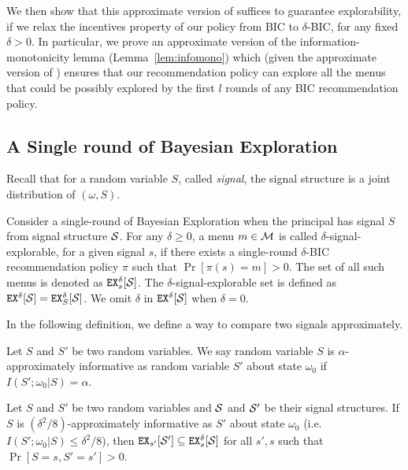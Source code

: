 We then show that this approximate version of   suffices to guarantee explorability, if we relax the incentives property of our policy from BIC to $\delta$-BIC, for any fixed $\delta>0$. In particular, we prove an approximate version of the information-monotonicity lemma (Lemma~\ref{lem:infomono}) which (given the approximate version of ) ensures that our recommendation policy can explore all the menus that could be possibly explored by the first $l$ rounds of any BIC recommendation policy.


\subsection{A Single round of Bayesian Exploration}
\label{sec:private_single}

Recall that for a random variable $S$, called \emph{signal}, the signal structure is a joint distribution of $(\omega,S)$.

\begin{definition}
Consider a single-round of Bayesian Exploration when the principal has signal $S$ from signal structure $\S$. For any $\delta \geq 0$, a menu $m \in \M$ is called $\delta$-signal-explorable, for a given signal $s$, if there exists a single-round $\delta$-BIC recommendation policy $\pi$ such that $\Pr[\pi(s) = m] > 0$. The set of all such menus is denoted as $\EX^{\delta}_s[\S]$. The $\delta$-signal-explorable set is defined as $\EX^{\delta}[\S] = \EX^{\delta}_S[\S]$. We omit $\delta$ in $\EX^{\delta}[\S]$ when $\delta = 0$.
\end{definition}

In the following definition, we define a way to compare two signals approximately.
\begin{definition}
Let $S$ and $S'$ be two random variables. We say random variable $S$ is $\alpha$-approximately informative as random variable $S'$ about state $\omega_0$ if $I(S' ; \omega_0|S) = \alpha$.
\end{definition}

\begin{lemma}
\label{lem:ainfomono}
Let $S$ and $S'$ be two random variables and $\S$ and $\S'$ be their signal structures. If $S$ is $(\delta^2/8)$-approximately informative as $S'$ about state $\omega_0$ (i.e. $I(S' ; \omega_0|S) \leq \delta^2/8$), then $\EX_{s'}[\S'] \subseteq \EX^{\delta}_s[\S]$  for all $s' ,s$ such that $\Pr[S= s, S'= s'] > 0$.
\end{lemma}

